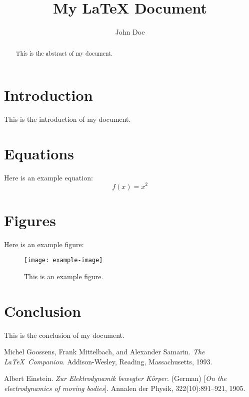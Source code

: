 \documentclass{article}
\title{My LaTeX Document}
\author{John Doe}
\begin{document}
\maketitle

\begin{abstract}
This is the abstract of my document.
\end{abstract}

\section{Introduction}
This is the introduction of my document.

\section{Equations}
Here is an example equation:
\begin{equation}
    f(x) = x^2
\end{equation}

\section{Figures}
Here is an example figure:
\begin{figure}[h]
    \centering
    \texttt{[image: example-image]}
    \caption{This is an example figure.}
    \label{fig:example}
\end{figure}

\section{Conclusion}
This is the conclusion of my document.

\begin{thebibliography}{9}
Michel Goossens, Frank Mittelbach, and Alexander Samarin. 
\textit{The \LaTeX\ Companion}. 
Addison-Wesley, Reading, Massachusetts, 1993.
 
Albert Einstein. 
\textit{Zur Elektrodynamik bewegter K{\"o}rper}. (German) 
[\textit{On the electrodynamics of moving bodies}]. 
Annalen der Physik, 322(10):891–921, 1905.
\end{thebibliography}
\end{document}
